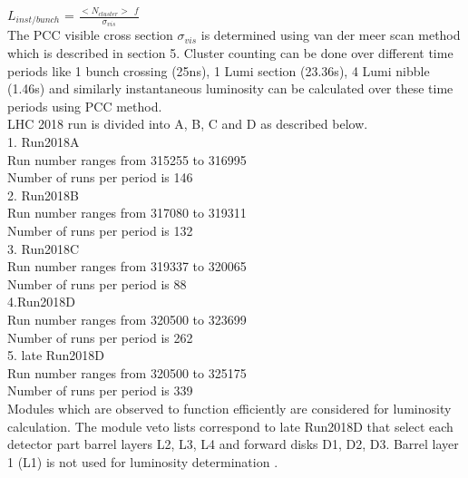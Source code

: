 $L_{inst/bunch}$ = $\frac{<N_{cluster}> \:\: f}{\sigma_{vis}}$ \\

The PCC visible cross section $\sigma_{vis}$ is determined using van der meer scan method which is described in section 5. Cluster counting can be done over different time periods like 1 bunch crossing (25ns), 1 Lumi section (23.36s), 4 Lumi nibble (1.46s) and similarly instantaneous luminosity can be calculated over these time periods using PCC method. \\

LHC 2018 run is divided into A, B, C and D as described below. \\

1. Run2018A \\

Run number ranges from 315255 to 316995 \\
Number of runs per period is 146 \\

2. Run2018B\\

Run number ranges from 317080 to 319311\\
Number of runs per period is 132\\

3. Run2018C \\

Run number ranges from 319337 to 320065\\
Number of runs per period is 88 \\

4.Run2018D \\

Run number ranges from 320500 to 323699 \\
Number of runs per period is 262 \\

5. late Run2018D \\

Run number ranges from 320500 to 325175 \\
Number of runs per period is 339 \\

Modules which are observed to function efficiently are considered for luminosity calculation. The module veto lists correspond to late Run2018D that select each detector part barrel layers L2, L3, L4 and forward disks D1, D2, D3. Barrel layer 1 (L1) is not used for luminosity determination \cite{vetolist}. \\

